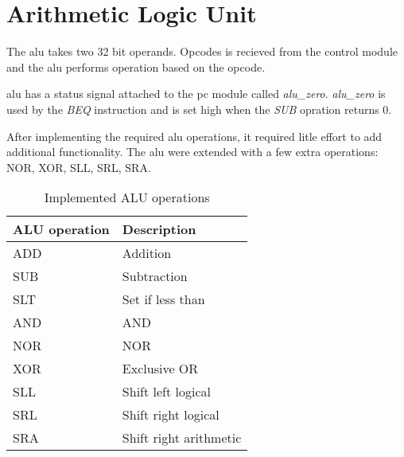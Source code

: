 \section{Arithmetic Logic Unit}
The \gls{alu} takes two 32 bit operands.
Opcodes is recieved from the control module and the \gls{alu} performs operation based on the opcode.

\gls{alu} has a status signal attached to the \gls{pc} module called \textit{alu\_zero}.
\textit{alu\_zero} is used by the \textit{BEQ} instruction and is set high when the \textit{SUB} opration returns 0.

After implementing the required \gls{alu} operations, it required litle effort to add additional functionality.
The \gls{alu} were extended with a few extra operations: NOR, XOR, SLL, SRL, SRA.

\begin{table}
\centering
\begin{tabular}{ |l|l| }
  \hline
  ALU operation & Description             \\ \hline
  ADD           & Addition                \\
  SUB           & Subtraction             \\
  SLT           & Set if less than        \\
  AND           & AND                     \\
  NOR           & NOR                     \\
  XOR           & Exclusive OR            \\
  SLL           & Shift left logical      \\
  SRL           & Shift right logical     \\
  SRA           & Shift right arithmetic  \\
  \hline
\end{tabular}
\caption{Implemented ALU operations}
\label{table:instructions}
\end{table}
